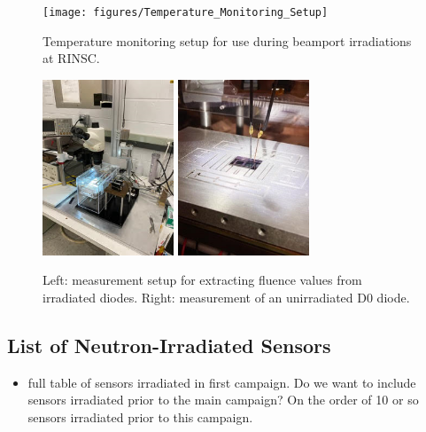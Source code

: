 \begin{figure}[!hbt]
  \begin{center}
    \texttt{[image: figures/Temperature\_Monitoring\_Setup]}
    \caption{Temperature monitoring setup for use during beamport irradiations at RINSC.}
    \label{fig:Temperature_Monitoring_Setup}
  \end{center}
\end{figure}

\begin{figure}[!hbt]
  \begin{center}
    \includegraphics[width=0.35\textwidth]{figures/CVIV_Setup}
    \includegraphics[width=0.35\textwidth]{figures/D0_Measurement}
    \caption{Left: measurement setup for extracting fluence values from irradiated diodes. Right: measurement of an unirradiated D0 diode.}
    \label{fig:Fluence_Measurement_Setup}
  \end{center}
\end{figure}

\subsection{List of Neutron-Irradiated Sensors}
\begin{itemize}
  \item full table of sensors irradiated in first campaign. Do we want to include sensors irradiated prior to the main campaign? On the order of 10 or so sensors irradiated prior to this campaign.
\end{itemize}

